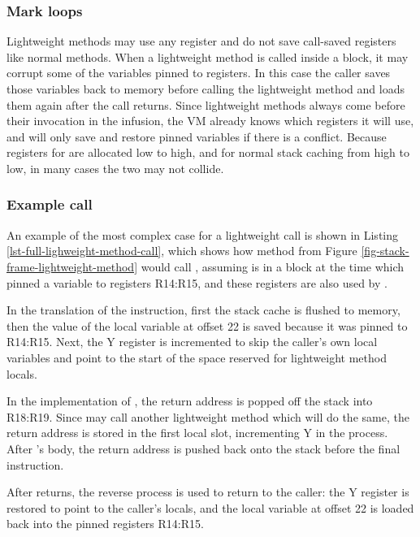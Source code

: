 \subsubsection{Mark loops}
Lightweight methods may use any register and do not save call-saved registers like normal methods. When a lightweight method is called inside a  block, it may corrupt some of the variables pinned to registers. In this case the caller saves those variables back to memory before calling the lightweight method and loads them again after the call returns. Since lightweight methods always come before their invocation in the infusion, the VM already knows which registers it will use, and will only save and restore pinned variables if there is a conflict. Because registers for  are allocated low to high, and for normal stack caching from high to low, in many cases the two may not collide.

\subsubsection{Example call}
An example of the most complex case for a lightweight call is shown in Listing \ref{lst-full-lighweight-method-call}, which shows how method  from Figure \ref{fig-stack-frame-lightweight-method} would call , assuming  is in a  block at the time which pinned a variable to registers R14:R15, and these registers are also used by .

In the translation of the  instruction, first the stack cache is flushed to memory, then the value of the local variable at offset 22 is saved because it was pinned to R14:R15. Next, the Y register is incremented to skip the caller's own local variables and point to the start of the space reserved for lightweight method locals.

In the implementation of , the return address is popped off the stack into R18:R19. Since  may call another lightweight method which will do the same, the return address is stored in the first local slot, incrementing Y in the process. After 's body, the return address is pushed back onto the stack before the final  instruction.

After  returns, the reverse process is used to return to the caller: the Y register is restored to point to the caller's locals, and the local variable at offset 22 is loaded back into the pinned registers R14:R15.

